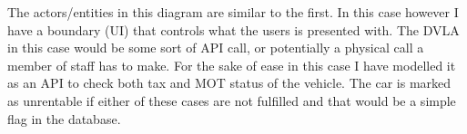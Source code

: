     The actors/entities in this diagram are similar to the first. In this case however I have a boundary (UI) that controls
    what the users is presented with. The DVLA in this case would be some sort of API call, or potentially a physical call a
    member of staff has to make. For the sake of ease in this case I have modelled it as an API to check both 
    tax and MOT status of the vehicle. The car is marked as unrentable if either of these cases are not fulfilled and that
    would be a simple flag in the database.

\newpage